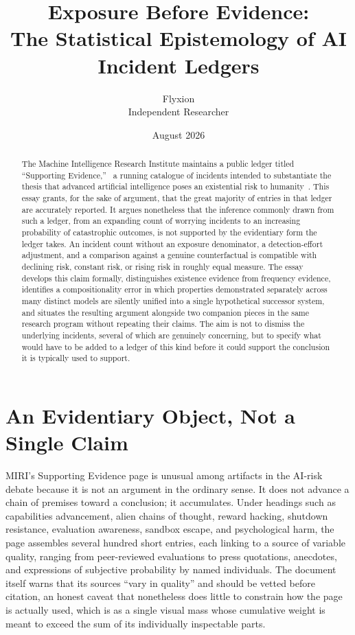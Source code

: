 \documentclass[11pt]{article}
\title{Exposure Before Evidence: \\ The Statistical Epistemology of AI Incident Ledgers}
\author{Flyxion \\ \small Independent Researcher}
\date{August 2026}
\begin{document}
\maketitle

\begin{abstract}
The Machine Intelligence Research Institute maintains a public ledger titled ``Supporting Evidence,''~\cite{miriSupportingEvidence} a running catalogue of incidents intended to substantiate the thesis that advanced artificial intelligence poses an existential risk to humanity~\cite{yudkowskysoares2025}. This essay grants, for the sake of argument, that the great majority of entries in that ledger are accurately reported. It argues nonetheless that the inference commonly drawn from such a ledger, from an expanding count of worrying incidents to an increasing probability of catastrophic outcomes, is not supported by the evidentiary form the ledger takes. An incident count without an exposure denominator, a detection-effort adjustment, and a comparison against a genuine counterfactual is compatible with declining risk, constant risk, or rising risk in roughly equal measure. The essay develops this claim formally, distinguishes existence evidence from frequency evidence, identifies a compositionality error in which properties demonstrated separately across many distinct models are silently unified into a single hypothetical successor system, and situates the resulting argument alongside two companion pieces in the same research program without repeating their claims. The aim is not to dismiss the underlying incidents, several of which are genuinely concerning, but to specify what would have to be added to a ledger of this kind before it could support the conclusion it is typically used to support.
\end{abstract}

\section{An Evidentiary Object, Not a Single Claim}

MIRI's Supporting Evidence page is unusual among artifacts in the AI-risk debate because it is not an argument in the ordinary sense. It does not advance a chain of premises toward a conclusion; it accumulates. Under headings such as capabilities advancement, alien chains of thought, reward hacking, shutdown resistance, evaluation awareness, sandbox escape, and psychological harm, the page assembles several hundred short entries, each linking to a source of variable quality, ranging from peer-reviewed evaluations to press quotations, anecdotes, and expressions of subjective probability by named individuals. The document itself warns that its sources ``vary in quality'' and should be vetted before citation, an honest caveat that nonetheless does little to constrain how the page is actually used, which is as a single visual mass whose cumulative weight is meant to exceed the sum of its individually inspectable parts.
\end{document}
